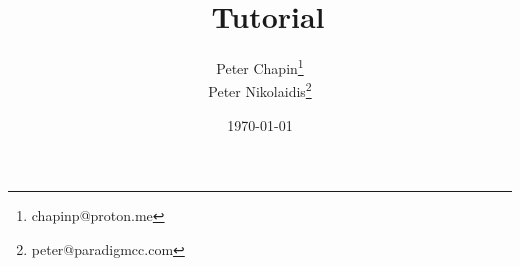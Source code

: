 \documentclass{report}
\begin{document}
\title{\CLAC\ Tutorial}
\author{Peter Chapin\thanks{chapinp@proton.me}\\
        Peter Nikolaidis\thanks{peter@paradigmcc.com}}
\date{\today}
\maketitle

\tableofcontents
\newpage
{}





\end{document}
